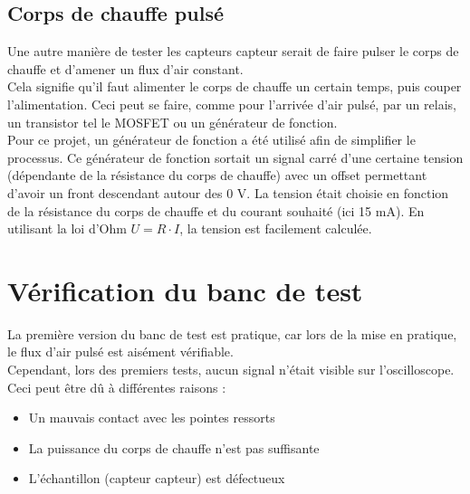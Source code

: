 \subsection{Corps de chauffe pulsé}
Une autre manière de tester les capteurs \gls{capteur} serait de faire pulser le corps de chauffe et d'amener un flux d'air constant. \\
Cela signifie qu'il faut alimenter le corps de chauffe un certain temps, puis couper l'alimentation. Ceci peut se faire, comme pour l'arrivée
d'air pulsé, par un relais, un transistor tel le MOSFET ou un générateur de fonction. \\

Pour ce projet, un générateur de fonction a été utilisé afin de simplifier le processus. Ce générateur de fonction sortait un signal carré
d'une certaine tension (dépendante de la résistance du corps de chauffe) avec un offset permettant d'avoir un front descendant autour des
0 V. La tension était choisie en fonction de la résistance du corps de chauffe et du courant souhaité (ici 15 mA). En utilisant la loi d'Ohm
$U = R\cdot I$, la tension est facilement calculée.

\section{Vérification du banc de test}
La première version du banc de test est pratique, car lors de la mise en pratique, le flux d'air pulsé est aisément vérifiable. \\
Cependant, lors des premiers tests, aucun signal n'était visible sur l'oscilloscope. Ceci peut être dû à différentes raisons :
\begin{itemize}
    \item Un mauvais contact avec les pointes ressorts\\
          
    \item La puissance du corps de chauffe n'est pas suffisante\\
          
    \item L'échantillon (capteur \gls{capteur}) est défectueux\\
\end{itemize}

